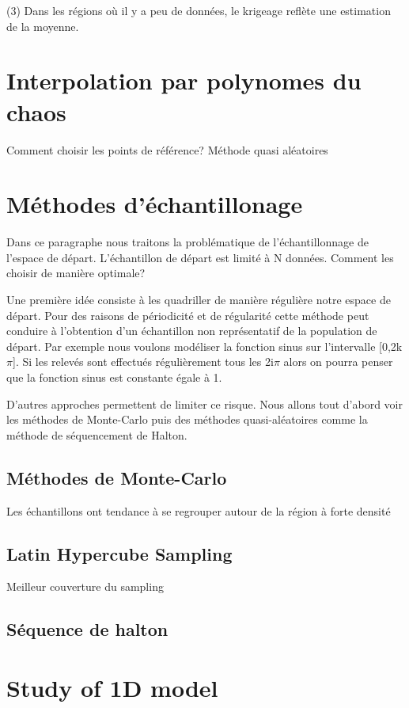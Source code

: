 \documentclass[hidelinks,12pt]{article}
\begin{document}
(3) Dans les régions où il y a peu de données, le krigeage reflète une estimation de la moyenne.

\section{Interpolation par polynomes du chaos}


Comment choisir les points de référence? Méthode quasi aléatoires
\section{Méthodes d’échantillonage}

Dans ce paragraphe nous traitons la problématique de l’échantillonnage de l’espace de départ. L’échantillon de départ est limité à N données. Comment les choisir de manière optimale? 

Une première idée consiste à les quadriller de manière régulière notre espace de départ. Pour des raisons de périodicité et de régularité cette méthode peut conduire à l’obtention d’un échantillon non représentatif de la population de départ. Par exemple nous voulons modéliser la fonction sinus sur l’intervalle [0,2k$\pi$]. Si les relevés sont effectués régulièrement tous les 2i$\pi$ alors on pourra penser que la fonction sinus est constante égale à 1. 

D’autres approches permettent de limiter ce risque. Nous allons tout d’abord voir les méthodes de Monte-Carlo puis des méthodes quasi-aléatoires comme la méthode de séquencement de Halton.

\subsection{Méthodes de Monte-Carlo}

Les échantillons ont tendance à se regrouper autour de la région à forte densité


\subsection{Latin Hypercube Sampling}

Meilleur couverture du sampling

\subsection{Séquence de halton}



\section{Study of 1D model}
\end{document}
